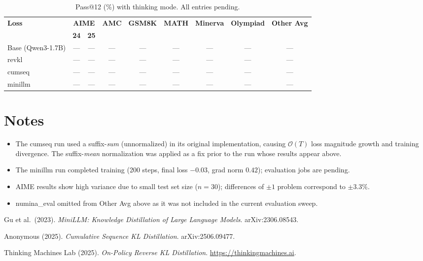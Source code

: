 \documentclass[11pt]{article}
\begin{document}
\begin{table}[h]
\centering
\caption{Pass@12 (\%) with thinking mode. All entries pending.}
\label{tab:pass12}
\begin{tabular}{lcccccccc}
\toprule
\multirow{2}{*}{\textbf{Loss}} & \multicolumn{2}{c}{\textbf{AIME}} & \multirow{2}{*}{\textbf{AMC}} & \multirow{2}{*}{\textbf{GSM8K}} & \multirow{2}{*}{\textbf{MATH}} & \multirow{2}{*}{\textbf{Minerva}} & \multirow{2}{*}{\textbf{Olympiad}} & \multirow{2}{*}{\textbf{Other Avg}} \\
\cmidrule(lr){2-3}
 & \textbf{24} & \textbf{25} & & & & & & \\
\midrule
Base (Qwen3-1.7B) & --- & --- & --- & --- & --- & --- & --- & --- \\
revkl             & --- & --- & --- & --- & --- & --- & --- & --- \\
cumseq            & --- & --- & --- & --- & --- & --- & --- & --- \\
minillm           & --- & --- & --- & --- & --- & --- & --- & --- \\
\bottomrule
\end{tabular}
\end{table}

\section{Notes}

\begin{itemize}
  \item The cumseq run used a suffix-\emph{sum} (unnormalized) in its original implementation, causing $\mathcal{O}(T)$ loss magnitude growth and training divergence. The suffix-\emph{mean} normalization was applied as a fix prior to the run whose results appear above.
  \item The minillm run completed training (200 steps, final loss $-0.03$, grad norm $0.42$); evaluation jobs are pending.
  \item AIME results show high variance due to small test set size ($n=30$); differences of $\pm 1$ problem correspond to $\pm 3.3\%$.
  \item numina\_eval omitted from Other Avg above as it was not included in the current evaluation sweep.
\end{itemize}


\begin{thebibliography}{9}

Gu et al.\ (2023).
\textit{MiniLLM: Knowledge Distillation of Large Language Models}.
arXiv:2306.08543.

Anonymous (2025).
\textit{Cumulative Sequence KL Distillation}.
arXiv:2506.09477.

Thinking Machines Lab (2025).
\textit{On-Policy Reverse KL Distillation}.
\url{https://thinkingmachines.ai}.

\end{thebibliography}
\end{document}
